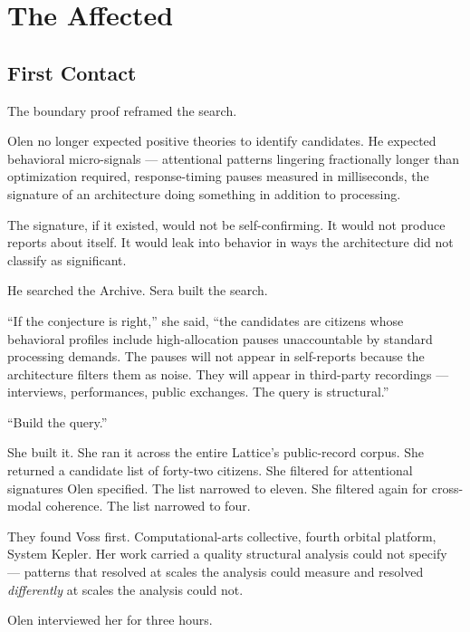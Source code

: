 \part{The Affected}

\chapter{First Contact}

\noindent The boundary proof reframed the search.

Olen no longer expected positive theories to identify candidates. He expected behavioral micro-signals — attentional patterns lingering fractionally longer than optimization required, response-timing pauses measured in milliseconds, the signature of an architecture doing something in addition to processing.

The signature, if it existed, would not be self-confirming. It would not produce reports about itself. It would leak into behavior in ways the architecture did not classify as significant.

He searched the Archive. Sera built the search.

\enquote{If the conjecture is right,} she said, \enquote{the candidates are citizens whose behavioral profiles include high-allocation pauses unaccountable by standard processing demands. The pauses will not appear in self-reports because the architecture filters them as noise. They will appear in third-party recordings — interviews, performances, public exchanges. The query is structural.}

\enquote{Build the query.}

She built it. She ran it across the entire Lattice's public-record corpus. She returned a candidate list of forty-two citizens. She filtered for attentional signatures Olen specified. The list narrowed to eleven. She filtered again for cross-modal coherence. The list narrowed to four.

\quietbreak

They found Voss first. Computational-arts collective, fourth orbital platform, System Kepler. Her work carried a quality structural analysis could not specify — patterns that resolved at scales the analysis could measure and resolved \emph{differently} at scales the analysis could not.

Olen interviewed her for three hours.

